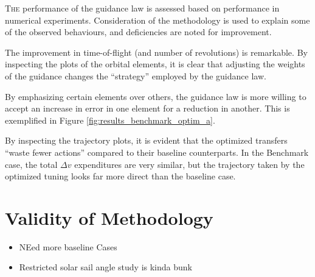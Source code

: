 \lettrine{T}{he} performance of the guidance law is assessed based on performance in numerical experiments. Consideration of the methodology is used to explain some of the observed behaviours, and deficiencies are noted for improvement.

The improvement in time-of-flight (and number of revolutions) is remarkable. By inspecting the plots of the orbital elements, it is clear that adjusting the weights of the guidance changes the ``strategy'' employed by the guidance law.

By emphasizing certain elements over others, the guidance law is more willing to accept an increase in error in one element for a reduction in another. This is exemplified in Figure \ref{fig:results_benchmark_optim_a}.

By inspecting the trajectory plots, it is evident that the optimized transfers ``waste fewer actions'' compared to their baseline counterparts. In the Benchmark case, the total \(\Delta v\) expenditures are very similar, but the trajectory taken by the optimized tuning looks far more direct than the baseline case.




\section{Validity of Methodology}

\begin{itemize}
  \item NEed more baseline Cases
  \item Restricted solar sail angle study is kinda bunk
\end{itemize}